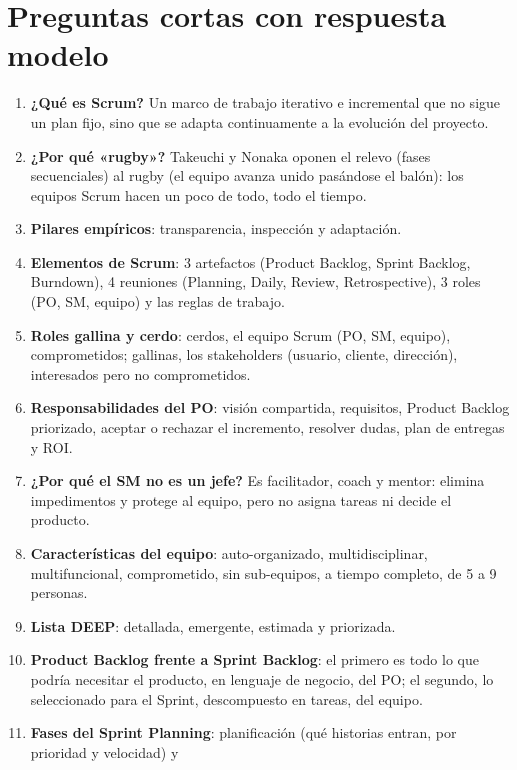 \documentclass[11pt,a4paper,oneside,openany]{report}
\begin{document}
\section{Preguntas cortas con respuesta modelo}
\begin{enumerate}[leftmargin=*,itemsep=4pt]
  \item \textbf{¿Qué es Scrum?} Un marco de trabajo iterativo e incremental que no sigue un plan fijo, sino que se adapta
        continuamente a la evolución del proyecto.
  \item \textbf{¿Por qué «rugby»?} Takeuchi y Nonaka oponen el relevo (fases secuenciales) al rugby (el equipo avanza
        unido pasándose el balón): los equipos Scrum hacen un poco de todo, todo el tiempo.
  \item \textbf{Pilares empíricos}: transparencia, inspección y adaptación.
  \item \textbf{Elementos de Scrum}: 3 artefactos (Product Backlog, Sprint Backlog, Burndown), 4 reuniones
        (Planning, Daily, Review, Retrospective), 3 roles (PO, SM, equipo) y las reglas de trabajo.
  \item \textbf{Roles gallina y cerdo}: cerdos, el equipo Scrum (PO, SM, equipo), comprometidos; gallinas, los
        stakeholders (usuario, cliente, dirección), interesados pero no comprometidos.
  \item \textbf{Responsabilidades del PO}: visión compartida, requisitos, Product Backlog priorizado, aceptar o rechazar
        el incremento, resolver dudas, plan de entregas y ROI.
  \item \textbf{¿Por qué el SM no es un jefe?} Es facilitador, coach y mentor: elimina impedimentos y protege al equipo,
        pero no asigna tareas ni decide el producto.
  \item \textbf{Características del equipo}: auto-organizado, multidisciplinar, multifuncional, comprometido, sin
        sub-equipos, a tiempo completo, de 5 a 9 personas.
  \item \textbf{Lista DEEP}: detallada, emergente, estimada y priorizada.
  \item \textbf{Product Backlog frente a Sprint Backlog}: el primero es todo lo que podría necesitar el producto, en
        lenguaje de negocio, del PO; el segundo, lo seleccionado para el Sprint, descompuesto en tareas, del equipo.
  \item \textbf{Fases del Sprint Planning}: planificación (qué historias entran, por prioridad y velocidad) y

\end{enumerate}
\end{document}
